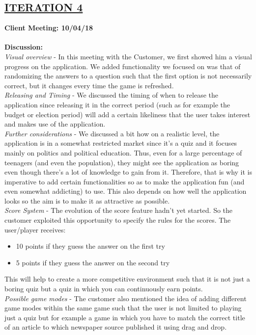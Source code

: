 \documentclass[paper=a4,fontsize=11pt]{article}
\newcommand{\SectionPart}[1]{\subsection*{\uppercase{#1}}}
\begin{document}
\SectionPart{\ul{Iteration 4}}
\hfill \textbf{Client Meeting: 10/04/18} \\
\\
\textbf{Discussion:}\\
\noindent
\textit{Visual overview} -
In this meeting with the Customer, we first showed him a visual progress on the application.
We added functionality we focused on was that of randomizing the answers to a question
such that the first option is not necessarily correct, but it changes every time the game is
refreshed.\\

\noindent
\textit{Releasing and Timing} -
We discussed the timing of when to release the application since releasing it in the correct
period (such as for example the budget or election period) will add a certain likeliness that the
user takes interest and makes use of the application.\\

\noindent
\textit{Further considerations} -
We discussed a bit how on a realistic level, the application is in a somewhat restricted market
since it’s a quiz and it focuses mainly on politics and political education. Thus, even for a
large percentage of teenagers (and even the population), they might see the application as
boring even though there's a lot of knowledge to gain from it. Therefore, that is why it is
imperative to add certain functionalities so as to make the application fun (and even
somewhat addicting) to use. This also depends on how well the application looks so the aim
is to make it as attractive as possible.\\

\noindent
\textit{Score System} -
The evolution of the score feature hadn't yet started. So the customer exploited this
opportunity to specify the rules for the scores. The user/player receives:
\begin{itemize}
	\item 10 points if they guess the answer on the first try
	\item 5 points if they guess the answer on the second try
\end{itemize}
This will help to create a more competitive environment such that it is not just a boring quiz
but a quiz in which you can continuously earn points.\\

\noindent
\textit{Possible game modes} -
The customer also mentioned the idea of adding different game modes within the same game
such that the user is not limited to playing just a quiz but for example a game in which you
have to match the correct title of an article to which newspaper source published it using drag
and drop.\\
\end{document}
